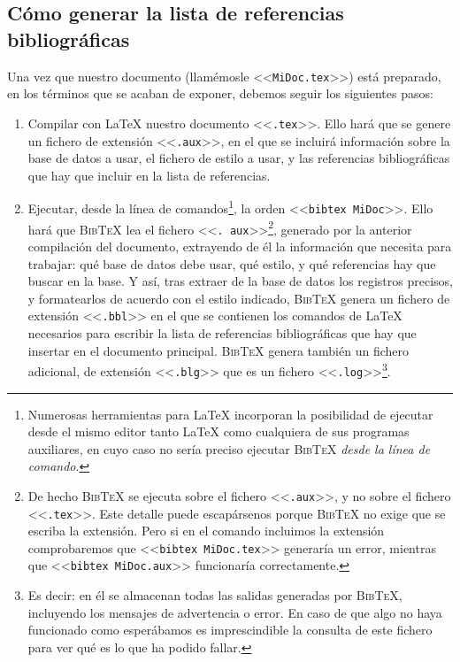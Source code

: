 \documentclass[a4paper,11pt]{article}
\def\btx-{\textsc{Bib\TeX}}
\def\ltx-{\LaTeX}
\def\ltr#1-{<<\texttt{#1}>>}
\def\tpf#1-{\ltr.#1-}
\begin{document}
\subsection{Cómo generar la lista de referencias bibliográficas}
\label{sec:como-generar-la}

Una vez que nuestro documento  (llamémosle \ltr MiDoc.tex-) está preparado, en
los términos que se acaban de exponer, debemos seguir los siguientes pasos:

\begin{enumerate}[1º]

\item Compilar con \ltx- nuestro documento  \tpf tex-. Ello hará que se genere
  un fichero de  extensión \tpf aux-, en el que  se incluirá información sobre
  la base  de datos a  usar, el  fichero de estilo  a usar, y  las referencias
  bibliográficas que hay que incluir en la lista de referencias.

\item  Ejecutar, desde  la línea  de  comandos\footnote{Numerosas herramientas
    para \ltx-  incorporan la  posibilidad de ejecutar  desde el  mismo editor
    tanto \ltx- como  cualquiera de sus programas auxiliares,  en cuyo caso no
    sería preciso ejecutar \btx- \emph{desde  la línea de comando}.}, la orden
  \ltr   bibtex  MiDoc-.    Ello  hará   que   \btx-  lea   el  fichero   \tpf
  aux-\footnote{De hecho  \btx- se  ejecuta sobre el  fichero \tpf aux-,  y no
    sobre el fichero  \tpf tex-. Este detalle puede  escapársenos porque \btx-
    no exige que  se escriba la extensión. Pero si en  el comando incluimos la
    extensión  comprobaremos que  \ltr bibtex  MiDoc.tex- generaría  un error,
    mientras que \ltr  bibtex MiDoc.aux- funcionaría correctamente.}, generado
  por la anterior  compilación del documento, extrayendo de  él la información
  que necesita para  trabajar: qué base de datos debe usar,  qué estilo, y qué
  referencias hay que  buscar en la base.   Y así, tras extraer de  la base de
  datos  los registros  precisos,  y  formatearlos de  acuerdo  con el  estilo
  indicado,  \btx- genera  un fichero  de  extensión \tpf  bbl- en  el que  se
  contienen  los  comandos de  \ltx-  necesarios  para  escribir la  lista  de
  referencias bibliográficas  que hay que insertar en  el documento principal.
  \btx- genera también un fichero adicional,  de extensión \tpf blg- que es un
  fichero \tpf  log-\footnote{Es decir: en  él se almacenan todas  las salidas
    generadas por  \btx-, incluyendo los  mensajes de advertencia o  error. En
    caso de que algo no  haya funcionado como esperábamos es imprescindible la
    consulta de este fichero para ver qué es lo que ha podido fallar.}.


\end{enumerate}
\end{document}
